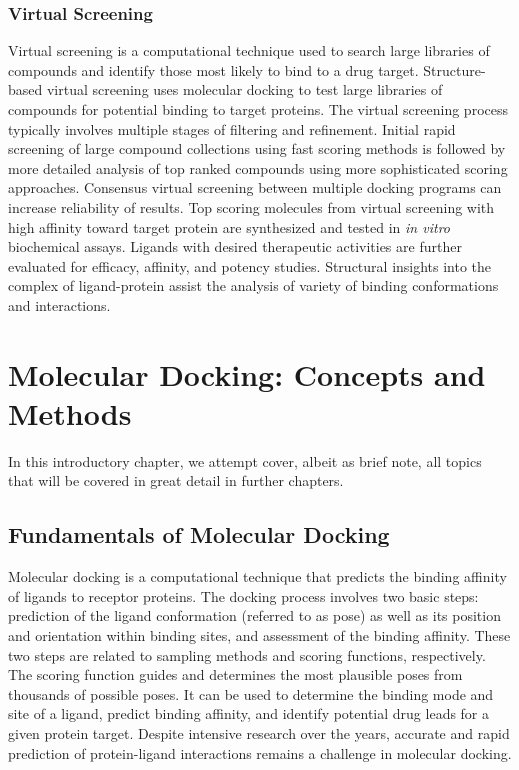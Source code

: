 \subsubsection{Virtual Screening}
Virtual screening is a computational technique used to search large libraries of compounds and identify those most likely to bind to a drug target. Structure-based virtual screening uses molecular docking to test large libraries of compounds for potential binding to target proteins. The virtual screening process typically involves multiple stages of filtering and refinement. Initial rapid screening of large compound collections using fast scoring methods is followed by more detailed analysis of top ranked compounds using more sophisticated scoring approaches. Consensus virtual screening between multiple docking programs can increase reliability of results. Top scoring molecules from virtual screening with high affinity toward target protein are synthesized and tested in \textit{in vitro} biochemical assays. Ligands with desired therapeutic activities are further evaluated for efficacy, affinity, and potency studies. Structural insights into the complex of ligand-protein assist the analysis of variety of binding conformations and interactions.


\section{Molecular Docking: Concepts and Methods}
In this introductory chapter, we attempt cover, albeit as brief note, all topics that will be covered in great detail in further chapters.

\subsection{Fundamentals of Molecular Docking}
Molecular docking is a computational technique that predicts the binding affinity of ligands to receptor proteins. The docking process involves two basic steps: prediction of the ligand conformation (referred to as pose) as well as its position and orientation within binding sites,  and assessment of the binding affinity. These two steps are related to sampling methods and scoring functions, respectively. The scoring function guides and determines the most plausible poses from thousands of possible poses. It can be used to determine the binding mode and site of a ligand, predict binding affinity, and identify potential drug leads for a given protein target. Despite intensive research over the years, accurate and rapid prediction of protein-ligand interactions remains a challenge in molecular docking.

